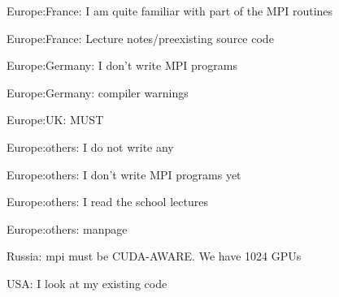 \item Europe:France: I am quite familiar with part of the MPI routines
\item Europe:France: Lecture notes/preexisting source code
\item Europe:Germany: I don't write MPI programs
\item Europe:Germany: compiler warnings
\item Europe:UK: MUST
\item Europe:others: I do not write any
\item Europe:others: I don't write MPI programs yet
\item Europe:others: I read the school lectures
\item Europe:others: manpage
\item Russia: mpi must be CUDA-AWARE. We have 1024 GPUs
\item USA: I look at my existing code
